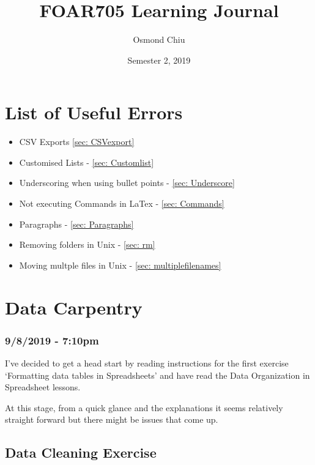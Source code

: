 \documentclass{article}
\title{FOAR705 Learning Journal}
\author{Osmond Chiu}
\date{Semester 2, 2019}
\begin{document}
\maketitle
\tableofcontents
\newpage

\section{List of Useful Errors}\par
\begin{itemize}
    \item CSV Exports \ref{sec: CSVexport}
    \item Customised Lists - \ref{sec: Customlist}
    \item Underscoring when using bullet points - \ref{sec: Underscore}
    \item Not executing Commands in LaTex - \ref{sec: Commands}
    \item Paragraphs - \ref{sec: Paragraphs}\par
    \item Removing folders in Unix - \ref{sec: rm}\par
    \item Moving multple files in Unix - \ref{sec: multiplefilenames}\par
\end{itemize}



\par


\newpage
\section{Data Carpentry}
\subsubsection*{9/8/2019 - 7:10pm}
I’ve decided to get a head start by reading instructions for the first exercise ‘Formatting data tables in Spreadsheets’ and have read the Data Organization in Spreadsheet lessons.\par
At this stage, from a quick glance and the explanations it seems relatively straight forward but there might be issues that come up.\par
\subsection{Data Cleaning Exercise}
\end{document}
